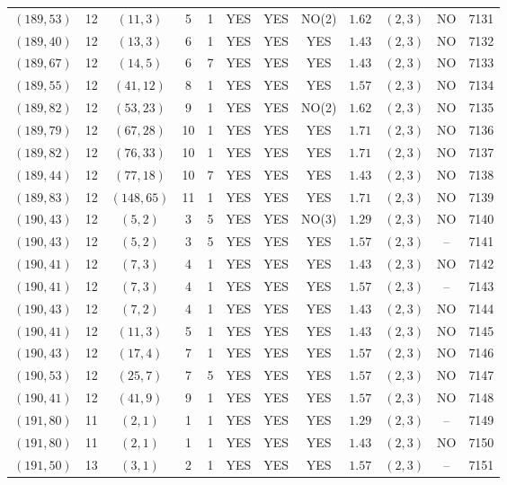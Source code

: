 \begin{longtable}{|c|c|c|c|c|c|c|c|c|c|c|c|}
$(189,53)$ & 12 & $(11,3)$ & 5 & 1 & YES & YES & NO(2) & $1.62$ & $(2,3)$ & NO & 7131\\
$(189,40)$ & 12 & $(13,3)$ & 6 & 1 & YES & YES & YES & $1.43$ & $(2,3)$ & NO & 7132\\
$(189,67)$ & 12 & $(14,5)$ & 6 & 7 & YES & YES & YES & $1.43$ & $(2,3)$ & NO & 7133\\
$(189,55)$ & 12 & $(41,12)$ & 8 & 1 & YES & YES & YES & $1.57$ & $(2,3)$ & NO & 7134\\
$(189,82)$ & 12 & $(53,23)$ & 9 & 1 & YES & YES & NO(2) & $1.62$ & $(2,3)$ & NO & 7135\\
$(189,79)$ & 12 & $(67,28)$ & 10 & 1 & YES & YES & YES & $1.71$ & $(2,3)$ & NO & 7136\\
$(189,82)$ & 12 & $(76,33)$ & 10 & 1 & YES & YES & YES & $1.71$ & $(2,3)$ & NO & 7137\\
$(189,44)$ & 12 & $(77,18)$ & 10 & 7 & YES & YES & YES & $1.43$ & $(2,3)$ & NO & 7138\\
$(189,83)$ & 12 & $(148,65)$ & 11 & 1 & YES & YES & YES & $1.71$ & $(2,3)$ & NO & 7139\\
$(190,43)$ & 12 & $(5,2)$ & 3 & 5 & YES & YES & NO(3) & $1.29$ & $(2,3)$ & NO & 7140\\
$(190,43)$ & 12 & $(5,2)$ & 3 & 5 & YES & YES & YES & $1.57$ & $(2,3)$ & -- & 7141\\
$(190,41)$ & 12 & $(7,3)$ & 4 & 1 & YES & YES & YES & $1.43$ & $(2,3)$ & NO & 7142\\
$(190,41)$ & 12 & $(7,3)$ & 4 & 1 & YES & YES & YES & $1.57$ & $(2,3)$ & -- & 7143\\
$(190,43)$ & 12 & $(7,2)$ & 4 & 1 & YES & YES & YES & $1.43$ & $(2,3)$ & NO & 7144\\
$(190,41)$ & 12 & $(11,3)$ & 5 & 1 & YES & YES & YES & $1.43$ & $(2,3)$ & NO & 7145\\
$(190,43)$ & 12 & $(17,4)$ & 7 & 1 & YES & YES & YES & $1.57$ & $(2,3)$ & NO & 7146\\
$(190,53)$ & 12 & $(25,7)$ & 7 & 5 & YES & YES & YES & $1.57$ & $(2,3)$ & NO & 7147\\
$(190,41)$ & 12 & $(41,9)$ & 9 & 1 & YES & YES & YES & $1.57$ & $(2,3)$ & NO & 7148\\
$(191,80)$ & 11 & $(2,1)$ & 1 & 1 & YES & YES & YES & $1.29$ & $(2,3)$ & -- & 7149\\
$(191,80)$ & 11 & $(2,1)$ & 1 & 1 & YES & YES & YES & $1.43$ & $(2,3)$ & NO & 7150\\
$(191,50)$ & 13 & $(3,1)$ & 2 & 1 & YES & YES & YES & $1.57$ & $(2,3)$ & -- & 7151\\

\end{longtable}

